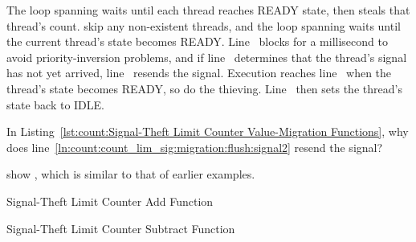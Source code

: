 \begin{lineref}
The loop spanning  waits until each
thread reaches READY state,
then steals that thread's count.
 skip any non-existent threads,
and the loop spanning
 waits until the current
thread's  state becomes READY.
Line~ blocks for a millisecond to avoid priority-inversion problems,
and if line~ determines that the thread's signal has not yet arrived,
line~ resends the signal.
Execution reaches line~ when the thread's  state becomes
READY, so  do the thieving.
Line~ then sets the thread's  state back to IDLE.
\end{lineref}

\QuickQuiz{}
	In Listing~\ref{lst:count:Signal-Theft Limit Counter Value-Migration Functions},
        why does line~\ref{ln:count:count_lim_sig:migration:flush:signal2}
        resend the signal?
 \QuickQuizEnd

\begin{lineref}
 show , which is similar to that of
earlier examples.
\end{lineref}

\begin{listing}[tbp]

\caption{Signal-Theft Limit Counter Add Function}
\label{lst:count:Signal-Theft Limit Counter Add Function}
\end{listing}

\begin{listing}[tb]

\caption{Signal-Theft Limit Counter Subtract Function}
\label{lst:count:Signal-Theft Limit Counter Subtract Function}
\end{listing}

